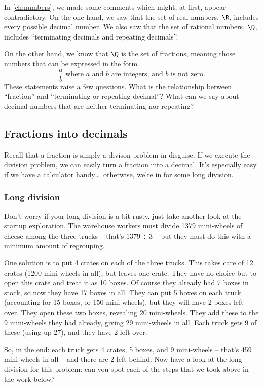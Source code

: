 In \cref{ch:numbers}, we made some comments which might, at first, appear contradictory. On the one hand, we saw that the set of real numbers, $\R$, includes every possible decimal number. We also saw that the set of rational numbers, $\Q$, includes ``terminating decimals and repeating decimals''. 

On the other hand, we know that $\Q$ is the set of fractions, meaning those numbers that can be expressed in the form \[\frac{a}{b} \text{ where $a$ and $b$ are integers, and $b$ is not zero.}\]
These statements raise a few questions. What is the relationship between ``fraction'' and ``terminating or repeating decimal''? What can we say about decimal numbers that are neither terminating nor repeating?

\subsection{Fractions into decimals}

Recall that a fraction is simply a divison problem in disguise. If we execute the division problem, we can easily turn a fraction into a decimal. It's especially easy if we have a calculator handy\ldots\ otherwise, we're in for some long division.

\subsubsection{Long division}

Don't worry if your long division is a bit rusty, just take another look at the startup exploration. The warehouse workers must divide 1379 mini-wheels of cheese among the three trucks -- that's $1379 \div 3$ -- but they must do this with a minimum amount of regrouping.

One solution is to put 4 crates on each of the three trucks. This takes care of 12 crates (1200 mini-wheels in all), but leaves one crate. They have no choice but to open this crate and treat it as 10 boxes. Of course they already had 7 boxes in stock, so now they have 17 boxes in all. They can put 5 boxes on each truck (accounting for 15 boxes, or 150 mini-wheels), but they will have 2 boxes left over. They open these two boxes, revealing 20 mini-wheels. They add these to the 9 mini-wheels they had already, giving 29 mini-wheels in all. Each truck gets 9 of these (using up 27), and they have 2 left over.

So, in the end: each truck gets 4 crates, 5 boxes, and 9 mini-wheels -- that's 459 mini-wheels in all -- and there are 2 left behind. Now have a look at the long division for this problem: can you spot each of the steps that we took above in the work below?


